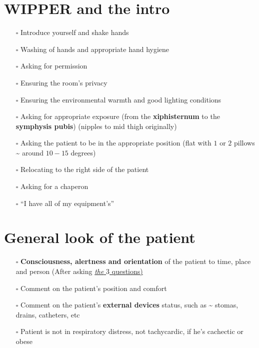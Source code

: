 \documentclass[
  13.5pt,
  a4paper,
  DIV=11,
  numbers=noendperiod]{scrreprt}
\providecommand{\tightlist}{%
  \setlength{\itemsep}{0pt}\setlength{\parskip}{0pt}}
\begin{document}
\section{WIPPER and the intro}\label{wipper-and-the-intro-3}

\begin{itemize}
\tightlist
\item[$\square$]
  Introduce yourself and shake hands
\item[$\square$]
  Washing of hands and appropriate hand hygiene
\item[$\square$]
  Asking for permission
\item[$\square$]
  Ensuring the room's privacy
\item[$\square$]
  Ensuring the environmental warmth and good lighting conditions
\item[$\square$]
  Asking for appropriate exposure (from the \textbf{xiphisternum} to the
  \textbf{symphysis pubis}) (nipples to mid thigh originally)
\item[$\square$]
  Asking the patient to be in the appropriate position (flat with \(1\)
  or \(2\) pillows \textasciitilde{} around \(10-15\) degrees)
\item[$\square$]
  Relocating to the right side of the patient
\item[$\square$]
  Asking for a chaperon
\item[$\square$]
  ``I have all of my equipment's''
\end{itemize}

\section{General look of the
patient}\label{general-look-of-the-patient-3}

\begin{itemize}
\tightlist
\item[$\square$]
  \textbf{Consciousness, alertness and orientation} of the patient to
  time, place and person (After asking
  \href{miscellaneous.qmd}{\emph{the} \(3\) questions)}
\item[$\square$]
  Comment on the patient's position and comfort
\item[$\square$]
  Comment on the patient's \textbf{external devices} status, such as
  \textasciitilde{} stomas, drains, catheters, etc
\item[$\square$]
  Patient is not in respiratory distress, not tachycardic, if he's
  cachectic or obese
\end{itemize}
\end{document}
